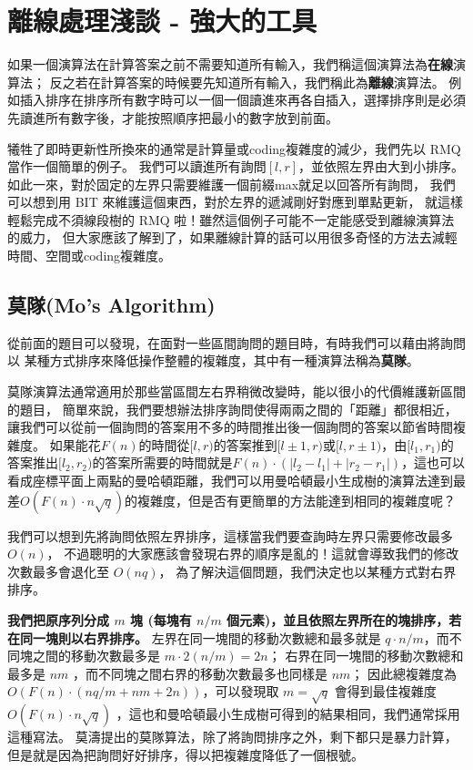 \chapter{離線處理淺談 - 強大的工具}
如果一個演算法在計算答案之前不需要知道所有輸入，我們稱這個演算法為\textbf{在線}演算法；
反之若在計算答案的時候要先知道所有輸入，我們稱此為\textbf{離線}演算法。
例如插入排序在排序所有數字時可以一個一個讀進來再各自插入，選擇排序則是必須先讀進所有數字後，才能按照順序把最小的數字放到前面。


犧牲了即時更新性所換來的通常是計算量或coding複雜度的減少，我們先以 RMQ 當作一個簡單的例子。
我們可以讀進所有詢問$[l,r]$，並依照左界由大到小排序。
如此一來，對於固定的左界只需要維護一個前綴max就足以回答所有詢問，
我們可以想到用 BIT 來維護這個東西，對於左界的遞減剛好對應到單點更新，
就這樣輕鬆完成不須線段樹的 RMQ 啦！雖然這個例子可能不一定能感受到離線演算法的威力，
但大家應該了解到了，如果離線計算的話可以用很多奇怪的方法去減輕時間、空間或coding複雜度。

\section{莫隊(Mo's Algorithm)}
從前面的題目可以發現，在面對一些區間詢問的題目時，有時我們可以藉由將詢問以
某種方式排序來降低操作整體的複雜度，其中有一種演算法稱為\textbf{莫隊}。

莫隊演算法通常適用於那些當區間左右界稍微改變時，能以很小的代價維護新區間的題目，
簡單來說，我們要想辦法排序詢問使得兩兩之間的「距離」都很相近，讓我們可以從前一個詢問的答案用不多的時間推出後一個詢問的答案以節省時間複雜度。
如果能花$F(n)$的時間從$[l,r)$的答案推到$[l\pm 1,r)$或$[l,r\pm 1)$，由$[l_1,r_1)$的答案推出$[l_2,r_2)$的答案所需要的時間就是$F(n)\cdot(|l_2-l_1|+|r_2-r_1|)$，這也可以看成座標平面上兩點的曼哈頓距離，我們可以用曼哈頓最小生成樹的演算法達到最差$O(F(n)\cdot n\sqrt{q})$的複雜度，但是否有更簡單的方法能達到相同的複雜度呢？

我們可以想到先將詢問依照左界排序，這樣當我們要查詢時左界只需要修改最多 $O(n)$，
不過聰明的大家應該會發現右界的順序是亂的！這就會導致我們的修改次數最多會退化至 $O(nq)$，
為了解決這個問題，我們決定也以某種方式對右界排序。

\textbf{我們把原序列分成 $m$ 塊 (每塊有 $n/m$ 個元素)，並且依照左界所在的塊排序，若在同一塊則以右界排序。}
左界在同一塊間的移動次數總和最多就是 $q\cdot n/m$，而不同塊之間的移動次數最多是 $m\cdot 2(n/m) = 2n$；
右界在同一塊間的移動次數總和最多是 $nm$ ，而不同塊之間右界的移動次數最多也同樣是 $nm$；
因此總複雜度為 $O(F(n)\cdot (nq/m+nm+2n))$，可以發現取 $m=\sqrt{q}$ 會得到最佳複雜度 $O(F(n)\cdot n\sqrt{q})$ ，這也和曼哈頓最小生成樹可得到的結果相同，我們通常採用這種寫法。
莫濤提出的莫隊算法，除了將詢問排序之外，剩下都只是暴力計算，但是就是因為把詢問好好排序，得以把複雜度降低了一個根號。


